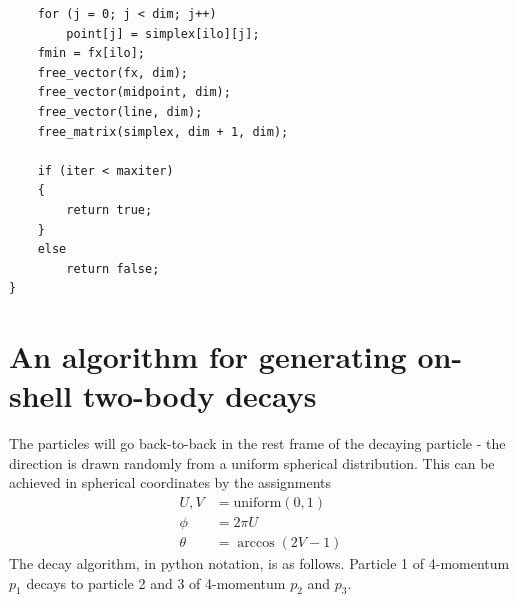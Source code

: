 \documentclass[twoside,english]{uiofysmaster}
\begin{document}
\begin{lstlisting}
	for (j = 0; j < dim; j++)
		point[j] = simplex[ilo][j];
	fmin = fx[ilo];
	free_vector(fx, dim);
	free_vector(midpoint, dim);
	free_vector(line, dim);
	free_matrix(simplex, dim + 1, dim);

	if (iter < maxiter)
	{
		return true;
	}
	else
		return false;
}
\end{lstlisting}








\chapter{An algorithm for generating on-shell two-body decays}
\label{ch:decayalgorithm}

 The particles will go back-to-back in the rest frame of the decaying particle - the direction is drawn randomly from a uniform spherical distribution. This can be achieved in spherical coordinates by the assignments
\begin{align}
	U, V &= \text{uniform}(0,1)\nonumber \\
	\phi &= 2\pi U\\
	\theta &= \arccos(2V-1) \nonumber
\end{align}
The decay algorithm, in python notation, is as follows. Particle 1 of 4-momentum $p_1$ decays to particle 2 and 3 of 4-momentum $p_2$ and $p_3$.
\end{document}
